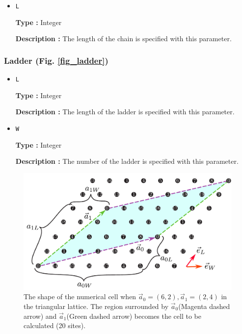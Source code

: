 \begin{itemize}

\item \verb|L|

{\bf Type :} Integer

{\bf Description :} The length of the chain is specified 
with this parameter.

\end{itemize}

\subsubsection{Ladder (Fig. \ref{fig_ladder})}

\begin{itemize}

\item \verb|L|

{\bf Type :} Integer

{\bf Description :} The length of the ladder is specified 
with this parameter.

\item \verb|W|

{\bf Type :} Integer

{\bf Description :} The number of the ladder is specified 
with this parameter.

\end{itemize}

\begin{figure}[!tbhp]
  \begin{center}
    \includegraphics[width=15cm]{../figs/chap04_1_unitlattice.pdf}
    \caption{The shape of the numerical cell 
      when ${\vec a}_0 = (6, 2), {\vec a}_1 = (2, 4)$
      in the triangular lattice.
      The region surrounded by 
      ${\vec a}_0$(Magenta dashed arrow) and ${\vec a}_1$(Green dashed arrow)
      becomes the cell to be calculated (20 sites).
    }
    \label{fig_chap04_1_unitlattice}
  \end{center}
\end{figure}

